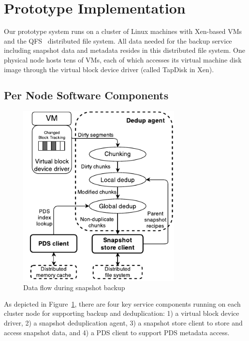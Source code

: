 \section{Prototype Implementation}
\label{sect:architecture}

Our prototype system runs on a cluster of Linux machines with Xen-based VMs 
and the QFS~\cite{michael2013} distributed file system. 
All data needed for the backup service including snapshot data and metadata
resides in this distributed file system. 
One physical node hosts tens of VMs, each of which accesses its virtual machine disk image through the
virtual block device driver (called TapDisk\cite{Warfield2005} in Xen).

\subsection{Per Node Software Components} 
\begin{figure}[htbp]
\vspace{2em}
    \centering
    \includegraphics[width=3.25in]{images/socc_arch_cluster}
    \caption{Data flow during snapshot backup}
    \label{fig:arch_vm}
\end{figure}
As depicted in Figure~\ref{fig:arch_vm}, 
there are four key service components running on each cluster
node  for supporting backup and deduplication: 
1) a virtual block device driver, 2) a snapshot deduplication agent,
3) a snapshot store client to store  and access snapshot data,
and 4)  a PDS client to support PDS metadata access. 

